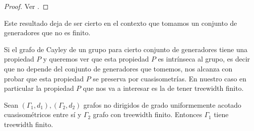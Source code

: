 \documentclass[tesis.tex]{subfiles}
\begin{document}
\begin{proof}
	Ver \cite[p.89]{loh2017geometric}.
\end{proof}

Este resultado deja de ser cierto en el contexto que tomamos un conjunto de generadores que no es finito.


Si el grafo de Cayley de un grupo para cierto conjunto de generadores tiene una propiedad $P$ y queremos ver que esta propiedad $P$ es intrínseca al grupo, es decir que no depende del conjunto de generadores que tomemos, nos alcanza con probar que esta propiedad $P$ se preserva por cuasisometrías.
En nuestro caso en particular la propiedad $P$ que nos va a interesar es la de tener treewidth finito.


\begin{prop} \label{treewidth-inv}
	Sean $(\Gamma_{1},d_{1}), (\Gamma_{2}, d_{2})$ grafos no dirigidos de grado uniformemente acotado cuasisométricos entre sí y $\Gamma_{2}$ grafo con treewidth finito.
	Entonces $\Gamma_{1}$ tiene treewidth finito.
\end{prop}
%
%	
%	
%	
%	
\end{document}
